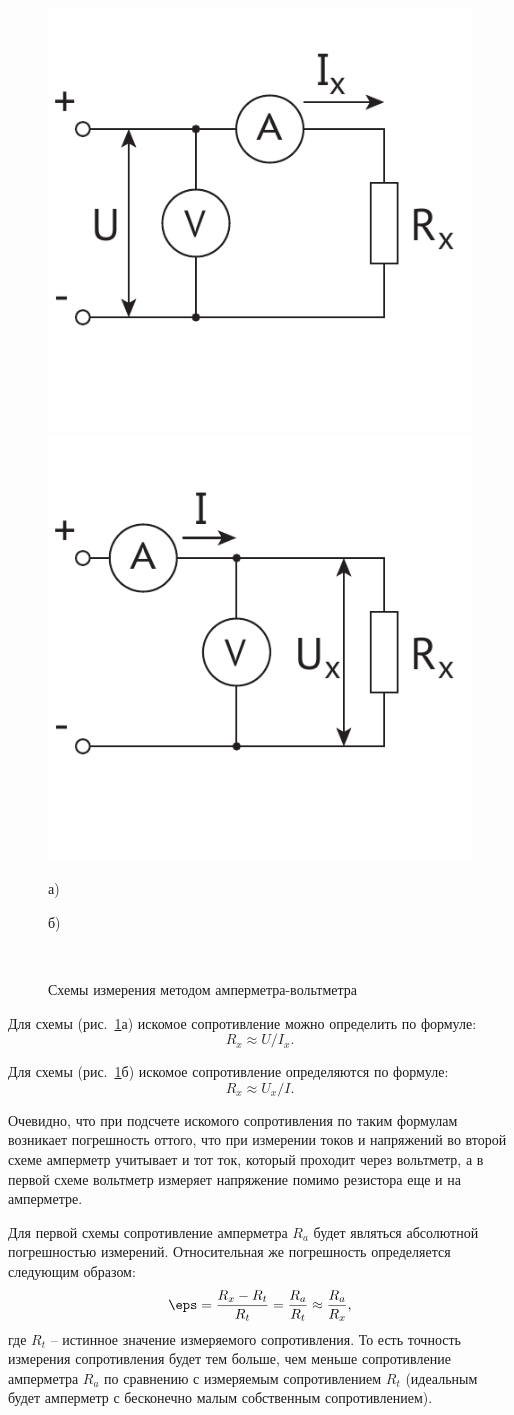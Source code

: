 \documentclass[pscyr,titlepage]{hedreport}
\newcommand{\Pic}[1]{\ref{pic#1}}
\newcommand{\pic}[1]{рис.~\Pic{#1}}
\begin{document}
  \begin{figure}[!b]
    \center
    \includegraphics[width=.4\textwidth]{AVa} \hspace{2em}
    \includegraphics[width=.4\textwidth]{AVb} \\
    
    \vspace{-4em}
    \parbox{.4\textwidth}{\center а)} \hspace{2em}
    \parbox{.4\textwidth}{\center б)} \\
    \caption{Схемы измерения методом амперметра-вольтметра}
    \label{picAV}
  \end{figure}

  Для схемы (\pic{AV}а) искомое сопротивление можно определить по формуле:
  \[
    R_x \approx U / I_x.
  \]
  
  Для схемы (\pic{AV}б) искомое сопротивление определяются по формуле:
  \[
    R_x \approx U_x / I.
  \]
 
  Очевидно, что при подсчете искомого сопротивления по таким формулам возникает
  погрешность оттого, что при измерении токов и напряжений во второй схеме
  амперметр учитывает и тот ток, который проходит через вольтметр, а в первой
  схеме вольтметр измеряет напряжение помимо резистора еще и на амперметре.
  
  Для первой схемы сопротивление амперметра \( R_a \) будет являться абсолютной
  погрешностью измерений. Относительная же погрешность определяется следующим
  образом:
  \[
    \eps = \frac{R_x - R_t}{R_t} = \frac{R_a}{R_t} \approx \frac{R_a}{R_x},
  \]
  где \( R_t \) -- истинное значение измеряемого сопротивления. То есть точность
  измерения сопротивления будет тем больше, чем меньше сопротивление амперметра
  \( R_a \) по сравнению с измеряемым сопротивлением \( R_t \) (идеальным будет
  амперметр с бесконечно малым собственным сопротивлением).
  
\end{document}
